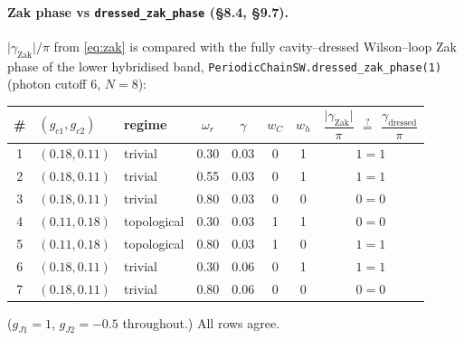 \documentclass[11pt]{article}
\newcommand{\wC}{w_C}
\newcommand{\wh}{w_h}
\begin{document}
\sloppy
\paragraph{Zak phase vs \texttt{dressed\_zak\_phase} (\S8.4, \S9.7).}
$\lvert\gamma_{\mathrm{Zak}}\rvert/\pi$ from \eqref{eq:zak} is compared with the
fully cavity--dressed Wilson--loop Zak phase of the lower hybridised band,
\texttt{PeriodicChainSW.}\allowbreak\texttt{dressed\_zak\_phase(1)} (photon cutoff $6$, $N=8$):

\begin{center}
\begin{tabular}{cllccccc}
\toprule
\# & $(g_{c1},g_{c2})$ & regime & $\omega_r$ & $\gamma$ &
   $\wC$ & $\wh$ & $\dfrac{\lvert\gamma_{\mathrm{Zak}}\rvert}{\pi}$ \;$\overset{?}{=}$\; $\dfrac{\gamma_{\mathrm{dressed}}}{\pi}$\\
\midrule
1 & $(0.18,0.11)$ & trivial      & 0.30 & 0.03 & 0 & 1 & $1=1$ \\
2 & $(0.18,0.11)$ & trivial      & 0.55 & 0.03 & 0 & 1 & $1=1$ \\
3 & $(0.18,0.11)$ & trivial      & 0.80 & 0.03 & 0 & 0 & $0=0$ \\
4 & $(0.11,0.18)$ & topological  & 0.30 & 0.03 & 1 & 1 & $0=0$ \\
5 & $(0.11,0.18)$ & topological  & 0.80 & 0.03 & 1 & 0 & $1=1$ \\
6 & $(0.18,0.11)$ & trivial      & 0.30 & 0.06 & 0 & 1 & $1=1$ \\
7 & $(0.18,0.11)$ & trivial      & 0.80 & 0.06 & 0 & 0 & $0=0$ \\
\bottomrule
\end{tabular}
\end{center}

\noindent
($g_{J1}=1$, $g_{J2}=-0.5$ throughout.) All rows agree.
\end{document}
